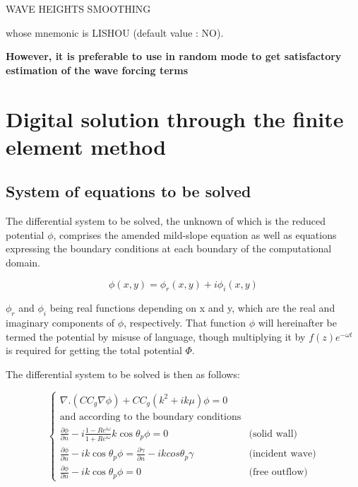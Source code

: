 WAVE HEIGHTS SMOOTHING

whose mnemonic is LISHOU (default value : NO).

\textbf{However, it is preferable to use \artemis{} in random mode to get satisfactory estimation of the wave forcing terms}


\section{Digital solution through the finite element method}\label{digi_sol}


\subsection{System of equations to be solved}

The differential system to be solved, the unknown of which is the reduced
potential $\phi$, comprises the amended mild-slope equation as well as
equations expressing the boundary conditions at each boundary of the
computational domain.

\begin{equation}
  \phi(x,y) = \phi_r (x,y) +i\phi_i (x,y)
  \label{eq:3.68}
\end{equation}

$\phi_{r}$ and $\phi_{i}$ being real functions depending on x and y, which are
the real and imaginary components of $\phi$, respectively. That function $\phi$
will hereinafter be termed the potential by misuse of language, though
multiplying it by $f(z)e^{-\omega t}$ is required for getting the total potential $\Phi$.

The differential system to be solved is then as follows:

\begin{equation}
  \left\{
  \begin{matrix}
    \nabla.(CC_g \nabla\phi)+CC_g(k^2+ik\mu)\phi = 0 & \\
    \text{and according to the boundary conditions} & \\
    \frac{\partial \phi}{\partial n} -i\frac{1-Re^{i\omega}}{1+Re^{i\omega}}k\cos\theta_p \phi = 0 \quad & \text{(solid wall)} \\
    \frac{\partial \phi}{\partial n} -ik\cos\theta_p \phi = \frac{\partial \gamma}{\partial n}-ikcos\theta_p \gamma \quad & \text{(incident wave)} \\
    \frac{\partial \phi}{\partial n} -ik\cos\theta_p \phi = 0 \quad & \text{(free outflow)}
  \end{matrix}
  \right.
  \label{eq:3.69}
\end{equation}


